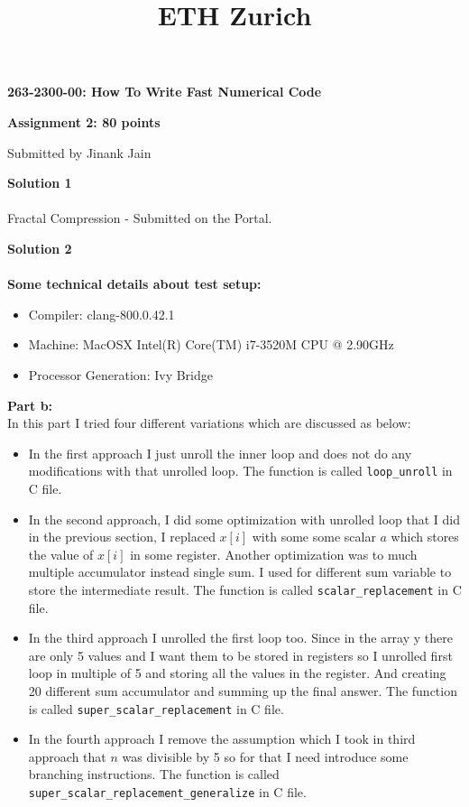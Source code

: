 \documentclass[letterpaper, 11pt]{article}
\title{ETH Zurich}
\begin{document}

\begin{center}
\Large \bf 263-2300-00: How To Write Fast Numerical Code

\Large \bf Assignment 2: 80 points

\large Submitted by Jinank Jain
\end{center}

\textbf{Solution 1}\\ \\
Fractal Compression - Submitted on the Portal.
\bigskip

\textbf{Solution 2}\\ \\
\textbf{Some technical details about test setup:} 
\begin{itemize}
\item Compiler: clang-800.0.42.1
\item Machine: MacOSX Intel(R) Core(TM) i7-3520M CPU @ 2.90GHz
\item Processor Generation: Ivy Bridge
\end{itemize}
\textbf{Part b:} \\
In this part I tried four different variations which are discussed as below:
\begin{itemize}
	\item In the first approach I just unroll the inner loop and does not do any modifications with that unrolled loop. The function is called \texttt{loop\_unroll} in C file.
	\item In the second approach, I did some optimization with unrolled loop that I did in the previous section, I replaced $x[i]$ with some some scalar $a$ which stores the value of $x[i]$ in some register. Another optimization was to much multiple accumulator instead single sum. I used for different sum variable to store the intermediate result. The function is called \texttt{scalar\_replacement} in C file.
	\item In the third approach I unrolled the first loop too. Since in the array y there are only 5 values and I want them to be stored in registers so I unrolled first loop in multiple of 5 and storing all the values in the register. And creating 20 different sum accumulator and summing up the final answer. The function is called \texttt{super\_scalar\_replacement} in C file.
	\item In the fourth approach I remove the assumption which I took in third approach that $n$ was divisible by 5 so for that I need introduce some branching instructions. The function is called \texttt{super\_scalar\_replacement\_generalize} in C file.
\end{itemize}
\end{document}
